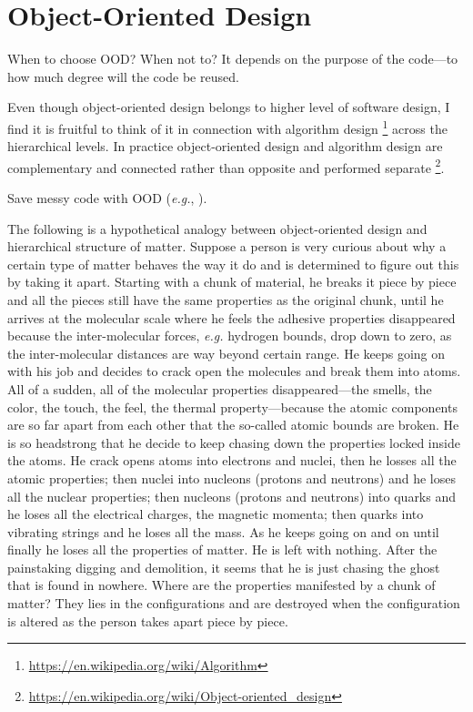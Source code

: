 
\chapter{Object-Oriented Design} \label{ch:ood}

When to choose OOD?
When not to?
It depends on the purpose of the code---to how much degree will the code be reused.

Even though object-oriented design belongs to higher level of software design, I find it is
fruitful to think of it in connection with algorithm design
\footnote{\url{https://en.wikipedia.org/wiki/Algorithm}} across the hierarchical levels.
In practice object-oriented design and algorithm design are complementary and connected
rather than opposite and performed separate
\footnote{\url{https://en.wikipedia.org/wiki/Object-oriented_design}}.

Save messy code with OOD (\textit{e.g.}, ).

The following is a hypothetical analogy between object-oriented design and hierarchical structure
of matter.
Suppose a person is very curious about why a certain type of matter behaves the way it do and is
determined to figure out this by taking it apart.
Starting with a chunk of material, he breaks it piece by piece and all the pieces still have the
same properties as the original chunk, until he arrives at the molecular scale where he
feels the adhesive properties disappeared because the inter-molecular forces, \textit{e.g.}
hydrogen bounds, drop down to zero, as the inter-molecular distances are way beyond certain
range.
He keeps going on with his job and decides to crack open the molecules and break them into atoms.
All of a sudden, all of the molecular properties disappeared---the smells, the color, the touch,
the feel, the thermal property---because the atomic components are so far apart from each
other that the so-called atomic bounds are broken.
He is so headstrong that he decide to keep chasing down the properties locked inside the atoms.
He crack opens atoms into electrons and nuclei, then he losses all the atomic properties;
then nuclei into nucleons (protons and neutrons) and he loses all the nuclear properties;
then nucleons (protons and neutrons) into quarks and he loses all the electrical charges, the
magnetic momenta;
then quarks into vibrating strings and he loses all the mass.
As he keeps going on and on until finally he loses all the properties of matter.
He is left with nothing.
After the painstaking digging and demolition, it seems that he is just chasing the
ghost that is found in nowhere.
Where are the properties manifested by a chunk of matter?
They lies in the configurations and are destroyed when the configuration is altered as the person
takes apart piece by piece.

